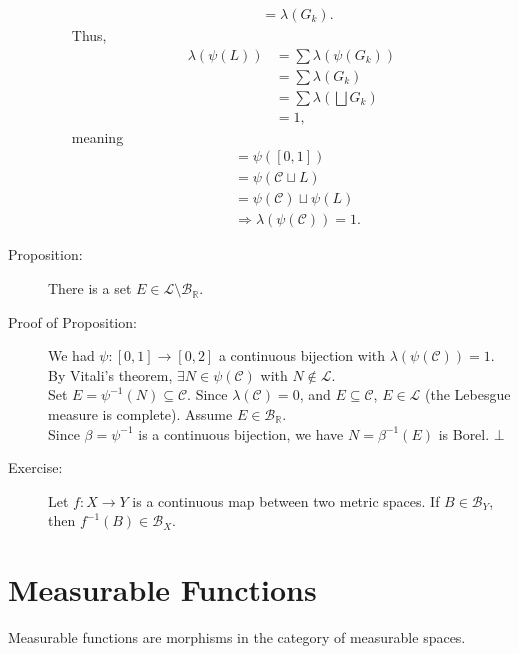 \documentclass[10pt]{extarticle}
\newcommand{\R}{\mathbb{R}}
\begin{document}
\begin{description}
\begin{enumerate}[(1)]
\begin{align*}
                               &= \lambda(G_k).
          \end{align*}
          Thus,
          \begin{align*}
            \lambda(\psi(L)) &= \sum \lambda(\psi(G_k))\\
                             &= \sum\lambda(G_k)\\
                             &= \sum \lambda\left(\bigsqcup G_k\right)\\
                             &= 1,
          \end{align*}
          meaning
          \begin{align*}
            [0,2] &= \psi([0,1])\\
                  &= \psi(\mathcal{C}\sqcup L)\\
                  &= \psi(\mathcal{C}) \sqcup \psi(L)\\
                  &\Rightarrow \lambda(\psi(\mathcal{C})) = 1.
          \end{align*}
      \end{enumerate}
    \item[Proposition:] There is a set $E\in \mathcal{L}\setminus \mathcal{B}_{\R}$.
    \item[Proof of Proposition:] We had $\psi: [0,1]\rightarrow [0,2]$ a continuous bijection with $\lambda\left(\psi(\mathcal{C})\right) = 1$. By Vitali's theorem, $\exists N\in \psi(\mathcal{C})$ with $N\notin \mathcal{L}$.\\

      Set $E = \psi^{-1}(N)\subseteq \mathcal{C}$. Since $\lambda\left(\mathcal{C}\right) = 0$, and $E\subseteq \mathcal{C}$, $E\in \mathcal{L}$ (the Lebesgue measure is complete). Assume $E\in \mathcal{B}_{\R}$.\\

      Since $\beta = \psi^{-1}$ is a continuous bijection, we have $N = \beta^{-1}(E)$ is Borel. $\bot$
    \item[Exercise:] Let $f: X\rightarrow Y$ is a continuous map between two metric spaces. If $B\in \mathcal{B}_{Y}$, then $f^{-1}(B)\in \mathcal{B}_{X}$.
  \end{description}
  \section{Measurable Functions}%
  Measurable functions are morphisms in the category of measurable spaces.\\
\end{document}
